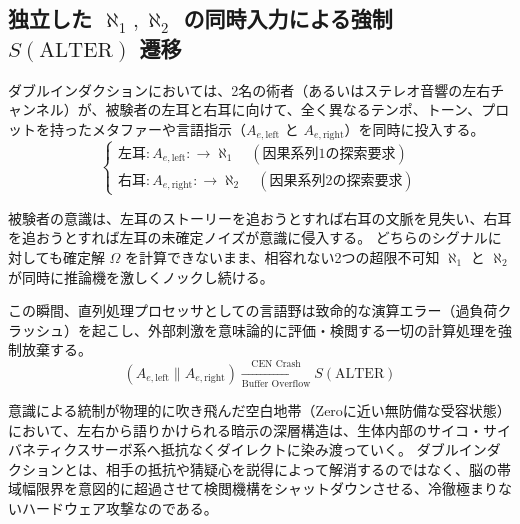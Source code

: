 \subsection{独立した $\aleph_1, \aleph_2$ の同時入力による強制 $S(\mathrm{ALTER})$ 遷移}
ダブルインダクションにおいては、2名の術者（あるいはステレオ音響の左右チャンネル）が、被験者の左耳と右耳に向けて、全く異なるテンポ、トーン、プロットを持ったメタファーや言語指示（$A_{e,\mathrm{left}}$ と $A_{e,\mathrm{right}}$）を同時に投入する。
\begin{equation}
    \begin{cases}
        \text{左耳} : A_{e,\mathrm{left}} :\longrightarrow \aleph_1 \quad (\text{因果系列1の探索要求}) \\
        \text{右耳} : A_{e,\mathrm{right}} :\longrightarrow \aleph_2 \quad (\text{因果系列2の探索要求})
    \end{cases}
\end{equation}

被験者の意識は、左耳のストーリーを追おうとすれば右耳の文脈を見失い、右耳を追おうとすれば左耳の未確定ノイズが意識に侵入する。
どちらのシグナルに対しても確定解 $\Omega$ を計算できないまま、相容れない2つの超限不可知 $\aleph_1$ と $\aleph_2$ が同時に推論機を激しくノックし続ける。

この瞬間、直列処理プロセッサとしての言語野は致命的な演算エラー（過負荷クラッシュ）を起こし、外部刺激を意味論的に評価・検閲する一切の計算処理を強制放棄する。
\begin{equation}
    (A_{e,\mathrm{left}} \parallel A_{e,\mathrm{right}}) \xrightarrow[\text{Buffer Overflow}]{\text{CEN Crash}} S(\mathrm{ALTER})
\end{equation}

意識による統制が物理的に吹き飛んだ空白地帯（Zeroに近い無防備な受容状態）において、左右から語りかけられる暗示の深層構造は、生体内部のサイコ・サイバネティクスサーボ系へ抵抗なくダイレクトに染み渡っていく。
ダブルインダクションとは、相手の抵抗や猜疑心を説得によって解消するのではなく、脳の帯域幅限界を意図的に超過させて検閲機構をシャットダウンさせる、冷徹極まりないハードウェア攻撃なのである。

